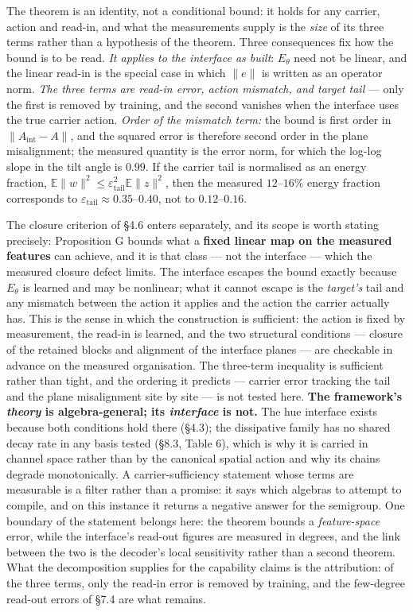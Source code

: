 The theorem is an identity, not a conditional bound: it holds for any carrier, action and read-in, and what the measurements supply is the \textit{size} of its three terms rather than a hypothesis of the theorem. Three consequences fix how the bound is to be read. \textit{It applies to the interface as built}: $E_\theta$ need not be linear, and the linear read-in is the special case in which $\|e\|$ is written as an operator norm. \textit{The three terms are read-in error, action mismatch, and target tail} --- only the first is removed by training, and the second vanishes when the interface uses the true carrier action. \textit{Order of the mismatch term:} the bound is first order in $\|A_{\mathrm{int}}-A\|$, and the squared error is therefore second order in the plane misalignment; the measured quantity is the error norm, for which the log-log slope in the tilt angle is $0.99$. If the carrier tail is normalised as an energy fraction, $\mathbb E\|w\|^2\le\varepsilon_{\mathrm{tail}}^2\mathbb E\|z\|^2$, then the measured $12$--$16\%$ energy fraction corresponds to $\varepsilon_{\mathrm{tail}}\approx0.35$--$0.40$, not to $0.12$--$0.16$.

The closure criterion of \S{}4.6 enters separately, and its scope is worth stating precisely: Proposition G bounds what a \textbf{fixed linear map on the measured features} can achieve, and it is that class --- not the interface --- which the measured closure defect limits. The interface escapes the bound exactly because $E_\theta$ is learned and may be nonlinear; what it cannot escape is the \textit{target's} tail and any mismatch between the action it applies and the action the carrier actually has. This is the sense in which the construction is sufficient: the action is fixed by measurement, the read-in is learned, and the two structural conditions --- closure of the retained blocks and alignment of the interface planes --- are checkable in advance on the measured organisation. The three-term inequality is sufficient rather than tight, and the ordering it predicts --- carrier error tracking the tail and the plane misalignment site by site --- is not tested here. \textbf{The framework's \textit{theory} is algebra-general; its \textit{interface} is not.} The hue interface exists because both conditions hold there (\S{}4.3); the dissipative family has no shared decay rate in any basis tested (\S{}8.3, Table 6), which is why it is carried in channel space rather than by the canonical spatial action and why its chains degrade monotonically. A carrier-sufficiency statement whose terms are measurable is a filter rather than a promise: it says which algebras to attempt to compile, and on this instance it returns a negative answer for the semigroup. One boundary of the statement belongs here: the theorem bounds a \textit{feature-space} error, while the interface's read-out figures are measured in degrees, and the link between the two is the decoder's local sensitivity rather than a second theorem. What the decomposition supplies for the capability claims is the attribution: of the three terms, only the read-in error is removed by training, and the few-degree read-out errors of \S{}7.4 are what remains.

